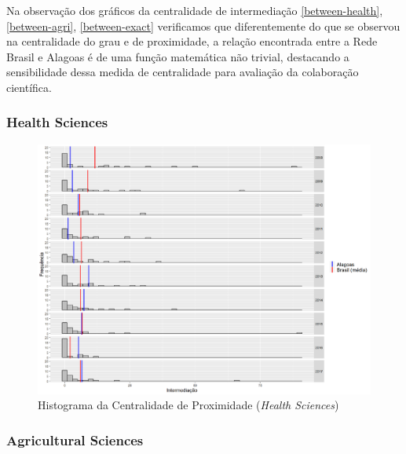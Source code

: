 Na observação dos gráficos da centralidade de intermediação \ref{between-health}, \ref{between-agri}, \ref{between-exact} verificamos que diferentemente do que se observou na centralidade do grau e de proximidade, a relação encontrada entre a Rede Brasil e Alagoas é de uma função matemática não trivial, destacando a sensibilidade dessa medida de centralidade para avaliação da colaboração científica. 





\subsubsection{Health Sciences}

\begin{figure}[H]
	\centering
	\includegraphics[scale=0.5]{Imagens/betweeness-hist.pdf}
	\caption{Histograma da Centralidade de Proximidade (\textit{Health Sciences})}
\end{figure}

\subsubsection{Agricultural Sciences}

